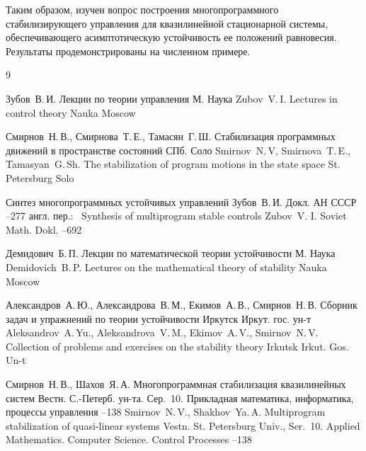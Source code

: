 \smallskip

 Таким образом, изучен вопрос построения
многопрограммного стабилизирующего управления для квазилинейной
стационарной системы, обеспечивающего асимптотическую устойчивость
ее положений равновесия. Результаты продемонстрированы на
численном примере.

\newpage

\begin{thebibliography}{9}

\by Зубов~В.\,И.
\book Лекции по теории управления
\publaddr М.
\publ Наука
\misctransl
\by  Zubov~V.\,I.
\book Lectures in control theory
\publ Nauka
\publaddr Moscow

\by Смирнов~Н.\,В., Смирнова~Т.\,Е., Тамасян~Г.\,Ш.
\book Стабилизация программных движений в пространстве состояний
\publaddr СПб.
\publ Соло
\misctransl
\by Smirnov~N.\,V, Smirnova~T.\,E., Tamasyan~G.\,Sh.
\book The stabilization of program motions in the state space
\publaddr St. Petersburg 
\publ Solo

\paper Синтез многопрограммных устойчивых управлений
\by Зубов~В.\,И.
\jour Докл. АН СССР
--277
\transl англ. пер.:~
\paper Synthesis of multiprogram stable controls
\by Zubov~V. I.
\jour Soviet Math. Dokl.
–692 

\by Демидович~Б.\,П.
\book Лекции по математической теории устойчивости
\publaddr М.
\publ Наука
\misctransl
\by Demidovich~B.\,P.
\book Lectures on the mathematical theory of stability
\publ Nauka
\publaddr Moscow 


\by Александров~А.\,Ю., Александрова~В.\,М., Екимов~А.\,В., Смирнов~Н.\,В.
\book Сборник задач и упражнений по теории устойчивости
\publaddr Иркутск
\publ Иркут. гос. ун-т
\misctransl
\by Aleksandrov~A.\,Yu., Aleksandrova~V.\,M., Ekimov~A.\,V., Smirnov~N.\,V.
\book Collection of problems and exercises on the stability theory
\publaddr Irkutsk
\publ Irkut. Gos. Un-t

\by Смирнов~Н.\,В., Шахов~Я.\,А.
\paper Многопрограммная стабилизация квазилинейных систем
\jour Вестн. С.-Петерб. ун-та. Сер.~10. Прикладная математика, информатика, процессы управления
--138
\misctransl
\by Smirnov~N.\,V., Shakhov~Ya.\,A.
\paper Multiprogram stabilization of quasi-linear systems
\jour Vestn. St. Petersburg Univ., Ser.~10. Applied Mathematics. Computer Science. Control Processes
--138

\end{thebibliography}


\noindent
\hskip6.5cm \thedate \par\noindent
\hskip6.5cm\therevdate


\makeengtitle



 \newpage
%
%